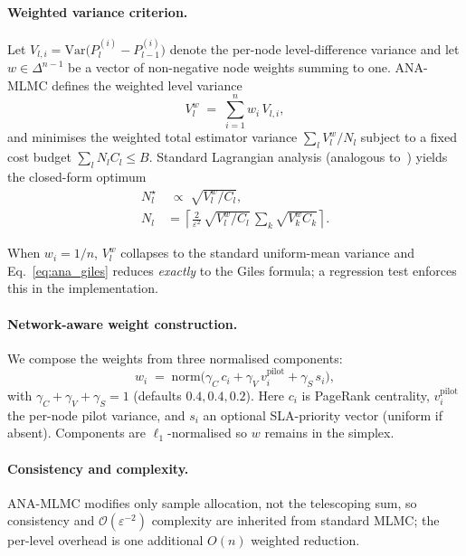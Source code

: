 \documentclass[pdflatex,sn-mathphys-num]{sn-jnl}
\theoremstyle{thmstyleone}%
\theoremstyle{thmstyletwo}%
\theoremstyle{thmstylethree}%
\begin{document}
\paragraph{Weighted variance criterion.}
Let $V_{l,i} = \mathrm{Var}\bigl(P_l^{(i)} - P_{l-1}^{(i)}\bigr)$ denote the per-node
level-difference variance and let $w \in \Delta^{n-1}$ be a vector of non-negative node weights
summing to one. ANA-MLMC defines the weighted level variance
\begin{equation}
    V_l^{w} \;=\; \sum_{i=1}^{n} w_i\, V_{l,i},
    \label{eq:ana_var}
\end{equation}
and minimises the weighted total estimator variance $\sum_l V_l^{w}/N_l$ subject to a fixed cost
budget $\sum_l N_l C_l \le B$. Standard Lagrangian analysis (analogous
to~\cite{giles2015multilevel}) yields the closed-form optimum
\begin{align}
    N_l^{\star} &\;\propto\; \sqrt{V_l^{w}/C_l}, \nonumber \\
    N_l &= \left\lceil \tfrac{2}{\varepsilon^{2}}\,
    \sqrt{V_l^{w}/C_l}\, \sum_k \sqrt{V_k^{w} C_k} \right\rceil .
    \label{eq:ana_giles}
\end{align}
\begin{sloppypar}
When $w_i = 1/n$, $V_l^{w}$ collapses to the standard uniform-mean variance and
Eq.~\eqref{eq:ana_giles} reduces \emph{exactly} to the Giles formula; a regression test
enforces this in the implementation.
\end{sloppypar}

\paragraph{Network-aware weight construction.}
We compose the weights from three normalised components:
\begin{equation}
    w_i \;=\; \mathrm{norm}\bigl(\gamma_C\, c_i
                + \gamma_V\, v_i^{\text{pilot}}
                + \gamma_S\, s_i\bigr),
    \label{eq:ana_weights}
\end{equation}
with $\gamma_C+\gamma_V+\gamma_S=1$ (defaults $0.4, 0.4, 0.2$). Here $c_i$ is PageRank centrality, $v_i^{\text{pilot}}$ the per-node pilot variance, and $s_i$ an optional SLA-priority vector (uniform if absent). Components are $\ell_1$-normalised so $w$ remains in the simplex.

\paragraph{Consistency and complexity.}
ANA-MLMC modifies only sample allocation, not the telescoping sum, so consistency and $\mathcal{O}(\varepsilon^{-2})$ complexity are inherited from standard MLMC; the per-level overhead is one additional $O(n)$ weighted reduction.
\end{document}

